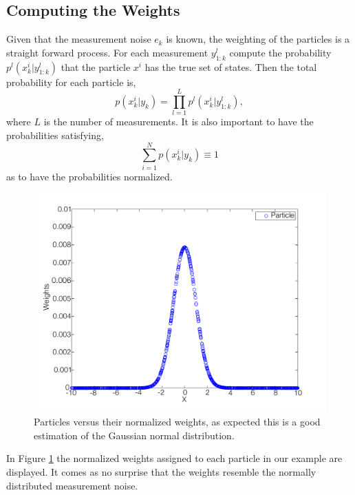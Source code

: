\documentclass{LTHthesis}
\begin{document}
\subsection{Computing the Weights}
%
Given that the measurement noise $e_k$ is known, the weighting of the particles is a straight forward process. For each measurement $y^l_{1:k}$ compute the probability $p^l(x^i_k|y^l_{1:k})$ that the particle $x^i$ has the true set of states. Then the total probability for each particle is,
%
\begin{equation}
p(x^i_k|y_k)=\prod_{l=1}^{L}p^l(x^i_k|y^l_{1:k}), 
\end{equation}
%
where $L$ is the number of measurements. It is also important to have the probabilities satisfying,
%
\begin{equation}
\sum^{N}_{i=1}p(x^i_k|y_k)\equiv 1
\end{equation}
%
as to have the probabilities normalized.
%
\begin{figure}[!hbt]

\includegraphics[width=1\textwidth ]{images/PF/particle_weights}
\caption{Particles versus their normalized weights, as expected this is a good estimation of the Gaussian normal distribution.}\label{particle_weights}
\end{figure}

In Figure \ref{particle_weights} the normalized weights assigned to each particle in our example are displayed. It comes as no surprise that the weights resemble the normally distributed measurement noise. 
%
\end{document}
